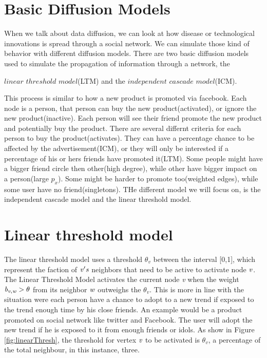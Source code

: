 \section{Basic Diffusion Models}
When we talk about data diffusion, we can look at how disease or technological innovations is spread through a social network. We can simulate those kind of behavior with different diffusion models. There are two basic diffusion models used to simulate the propagation of information through a network\cite{MaximizeSpread2003}, the {$linear$ $threshold$ $model$(LTM) and the $ independent$ $cascade$ $model$(ICM)\cite{MaximizeSpread2003}.

This process is similar to how a new product is promoted via facebook. Each node is a person, that person can buy the new product(activated), or ignore the new product(inactive). Each person will see their friend promote the new product and potentially buy the product. There are several differnt criteria for each person to buy the product(activates). They can have a percentage chance to be affected by the advertisement(ICM), or they will only be interested if a percentage of his or hers friends have promoted it(LTM). Some people might have a bigger friend circle then other(high degree), while other have bigger impact on a person(large $p_x$). Some might be harder to promote too(weighted edges), while some user have no friend(singletons). THe different model we will focus on, is the independent cascade model and the linear threshold model.

\section{Linear threshold model}
The linear threshold model uses a threshold $\theta_v$ between the interval [0,1], which represent the faction of $\it{v}'s$ neighbors that need to be active to activate node $\it{v}$. The Linear Threshold Model activates the current node {\it v} when the weight ${\it b_{v,w}} > \theta$ from its neighbor $\it{w}$ outweighs the $\theta_v$. This is more in line with the situation were each person have a chance to adopt to a new trend if exposed to the trend enough time by his close friends. An example would be a product promoted on social network like twitter and Facebook. The user will adopt the new trend if he is exposed to it from enough friends or idols. As show in Figure \ref{fig:linearThresh}, the threshold for vertex $\it{v}$ to be activated is $\theta_v$, a percentage of the total neighbour, in this instance, three.

}
